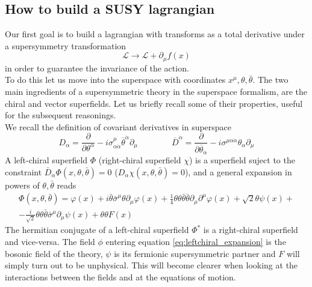 \documentclass[12pt]{article}
\begin{document}
\subsection*{How to build a SUSY lagrangian}
Our first goal is to build a lagrangian with transforms as a total derivative under a supersymmetry transformation
\begin{equation*}
  \mathcal{L} \to \mathcal{L} + \partial_\mu f(x)
\end{equation*}
in order to guarantee the invariance of the action. \\
To do this let us move into the superspace with coordinates $x^\mu, \theta, \bar\theta$. The two main ingredients of a supersymmetric theory in the superspace formalism, are the chiral and vector superfields. Let us briefly recall some of their properties, useful for the subsequent reasonings. \\
We recall the definition of covariant derivatives in superspace
\begin{equation*}
  D_{\alpha} = \frac{\partial}{\partial \theta^\alpha} - i \sigma^\mu_{\alpha \dot\alpha} \overline{\theta}^{\dot\alpha} \partial_\mu \qquad\qquad \overline{D}^{\dot\alpha} = \frac{\partial}{\partial \overline{\theta}_{\dot\alpha}} - i \sigma^{\mu \alpha \dot\alpha}\theta_\alpha \partial_\mu
\end{equation*}
A left-chiral superfield $\Phi$ (right-chiral superfield $\chi$) is a superfield suject to the constraint $\bar D_{\dot \alpha} \Phi(x, \theta, \bar\theta) = 0$  ($D_{\alpha} \chi(x, \theta, \bar\theta) = 0$), and a general expansion in powers of $\theta, \bar\theta$ reads
\begin{equation}
\begin{gathered}
  \Phi(x, \theta, \bar\theta) = \varphi(x) + i\bar\theta \bar\sigma^{\mu}\theta \partial_{\mu}\varphi(x) + \frac{1}{4}\theta\theta\bar\theta\bar\theta\partial_{\mu}\partial^{\mu}\varphi(x) + \sqrt{2}\theta\psi(x) + \\ 
                -\frac{i}{\sqrt{2}}\theta\theta\bar\theta\bar\sigma^{\mu}\partial_{\mu}\psi(x) + \theta\theta F(x)
\end{gathered}
\label{eq:leftchiral_expansion}
\end{equation}
The hermitian conjugate of a left-chiral superfield $\Phi^*$ is a right-chiral superfield and vice-versa.
The field $\phi$ entering equation \ref{eq:leftchiral_expansion} is the bosonic field of the theory, $\psi$ is its fermionic supersymmetric partner and $F$ will simply turn out to be unphysical. This will become clearer when looking at the interactions between the fields and at the equations of motion. \\
\end{document}
